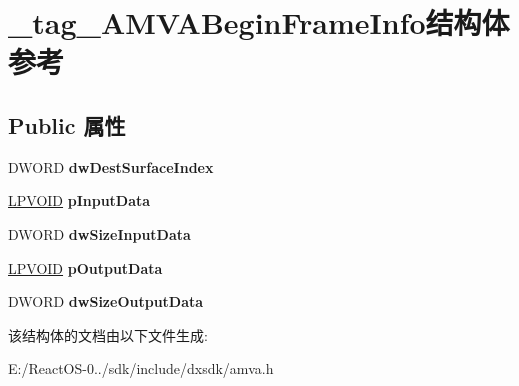 \hypertarget{struct__tag___a_m_v_a_begin_frame_info}{}\section{\+\_\+tag\+\_\+\+A\+M\+V\+A\+Begin\+Frame\+Info结构体 参考}
\label{struct__tag___a_m_v_a_begin_frame_info}
\subsection*{Public 属性}
\begin{DoxyCompactItemize}
\item 
\mbox{\label{struct__tag___a_m_v_a_begin_frame_info_a03cf44ef39bd1c95d4f92527ca412b64}} 
D\+W\+O\+RD {\bfseries dw\+Dest\+Surface\+Index}
\item 
\mbox{\label{struct__tag___a_m_v_a_begin_frame_info_acf6f503b5bbc899039967c9d4b6e744c}} 
\hyperlink{interfacevoid}{L\+P\+V\+O\+ID} {\bfseries p\+Input\+Data}
\item 
\mbox{\label{struct__tag___a_m_v_a_begin_frame_info_ab5a25da805e114800f49a537aef55788}} 
D\+W\+O\+RD {\bfseries dw\+Size\+Input\+Data}
\item 
\mbox{\label{struct__tag___a_m_v_a_begin_frame_info_a8a3cc79ab343d4b22fa085fcb82bfda9}} 
\hyperlink{interfacevoid}{L\+P\+V\+O\+ID} {\bfseries p\+Output\+Data}
\item 
\mbox{\label{struct__tag___a_m_v_a_begin_frame_info_a586e91aa8cc5eb90106134618d256bf2}} 
D\+W\+O\+RD {\bfseries dw\+Size\+Output\+Data}
\end{DoxyCompactItemize}


该结构体的文档由以下文件生成\+:\begin{DoxyCompactItemize}
\item 
E\+:/\+React\+O\+S-\/0../sdk/include/dxsdk/amva.\+h\end{DoxyCompactItemize}
